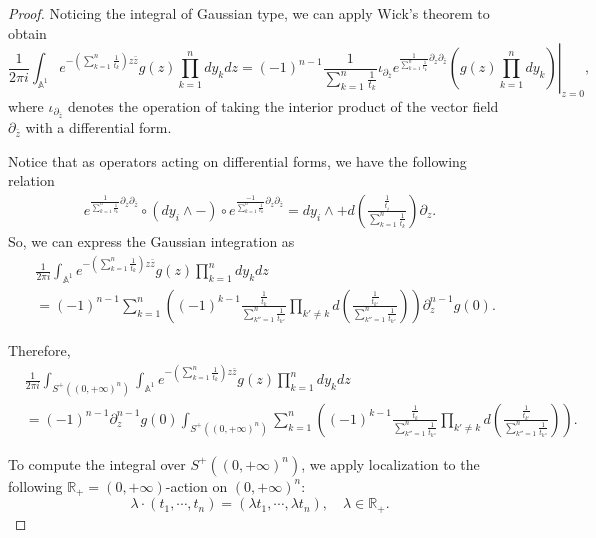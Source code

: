 \documentclass[11pt]{amsart}
\theoremstyle{definition}
\theoremstyle{remark}
\numberwithin{equation}{section}
\begin{document}
\begin{proof}
Noticing the integral of Gaussian type, we can apply Wick's theorem to obtain
\begin{equation}
    \frac{1}{2\pi i}\int_{\mathbb{A}^{1}}e^{-\left(\sum_{k=1}^{n}\frac{1}{t_{k}}\right)z\bar{z}}g(z)\prod_{k=1}^{n}dy_{k}dz
   =(-1)^{n-1}\left.\frac{1}{\sum_{k=1}^{n}\frac{1}{t_{k}}}\iota_{\partial_{\bar{z}}}e^{\frac{1}{\sum_{k=1}^{n}\frac{1}{t_{k}}}\partial_{z}\partial_{\bar{z}}}\left(g(z)\prod_{k=1}^{n}dy_{k}\right)\right|_{z=0},
\end{equation}
where $\iota_{\partial_{\bar{z}}}$ denotes the operation of taking the interior product of the vector field $\partial_{\bar{z}}$ with a differential form.

Notice that as operators acting on differential forms, we have the following relation
\begin{align*}
    e^{\frac{1}{\sum_{k=1}^{n}\frac{1}{t_{k}}}\partial_{z}\partial_{\bar{z}}}\circ \left(dy_{i} \wedge - \right) \circ e^{\frac{-1}{\sum_{k=1}^{n}\frac{1}{t_{k}}}\partial_{z}\partial_{\bar{z}}}=dy_{i} \wedge +d(\frac{\frac{1}{t_{i}}}{\sum_{k=1}^{n}\frac{1}{t_{k}}})\partial_{z}.
\end{align*}
So, we can express the Gaussian integration as
\begin{align*}
    &\frac{1}{2\pi i}\int_{\mathbb{A}^{1}}e^{-\left(\sum_{k=1}^{n}\frac{1}{t_{k}}\right)z\bar{z}}g(z)\prod_{k=1}^{n}dy_{k}dz\\
    &=
    (-1)^{n-1}\sum_{k=1}^{n}\left((-1)^{k-1}\frac{\frac{1}{t_{k}}}{\sum_{k''=1}^{n}\frac{1}{t_{k''}}}\prod_{k'\neq k}d(\frac{\frac{1}{t_{k'}}}{\sum_{k''=1}^{n}\frac{1}{t_{k''}}})\right)\partial_{z}^{n-1}g(0).
\end{align*}

Therefore, 
\begin{align*}
     &\frac{1}{2\pi i}\int_{S^{+}((0,+\infty)^n)}\int_{\mathbb{A}^{1}}e^{-\left(\sum_{k=1}^{n}\frac{1}{t_{k}}\right)z\bar{z}}g(z)\prod_{k=1}^{n}dy_{k}dz\\
     &=
     (-1)^{n-1}\partial_{z}^{n-1}g(0)\int_{S^{+}((0,+\infty)^n)}\sum_{k=1}^{n}\left((-1)^{k-1}\frac{\frac{1}{t_{k}}}{\sum_{k''=1}^{n}\frac{1}{t_{k''}}}\prod_{k'\neq k}d(\frac{\frac{1}{t_{k'}}}{\sum_{k''=1}^{n}\frac{1}{t_{k''}}})\right).
\end{align*}

To compute the integral over $S^{+}((0,+\infty)^n)$, we apply localization to the following $\mathbb{R}_+ = (0,+\infty)$-action on $(0,+\infty)^n$:
$$
\lambda\cdot (t_{1},\cdots,t_{n})=(\lambda t_{1},\cdots,\lambda t_{n}),\quad \lambda\in \mathbb{R}_+.
$$


\end{proof}
\end{document}
